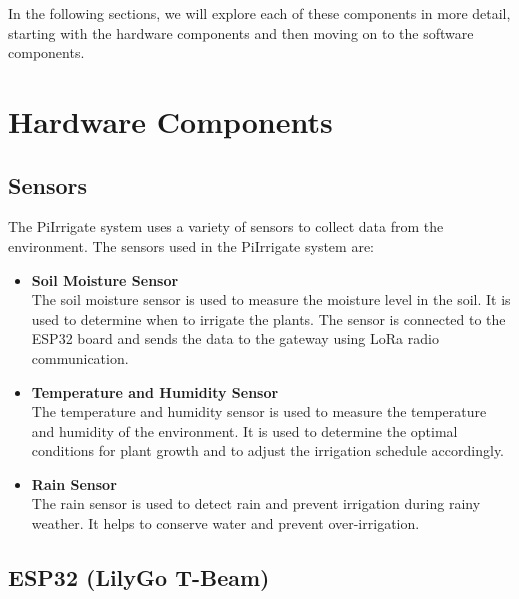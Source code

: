 In the following sections, we will explore each of these components in more detail,
starting with the hardware components and then moving on to the software components.

\section{Hardware Components}
\subsection{Sensors}
The PiIrrigate system uses a variety of sensors to collect data from the environment.
The sensors used in the PiIrrigate system are:
\begin{itemize}
  \item \textbf{Soil Moisture Sensor} \\
  The soil moisture sensor is used to measure the moisture level in the soil. It is used to determine when to irrigate the plants.
  The sensor is connected to the ESP32 board and sends the data to the gateway using LoRa radio communication.

  \item \textbf{Temperature and Humidity Sensor} \\
  The temperature and humidity sensor is used to measure the temperature and humidity of the environment.
  It is used to determine the optimal conditions for plant growth and to adjust the irrigation schedule accordingly.

  \item \textbf{Rain Sensor} \\
  The rain sensor is used to detect rain and prevent irrigation during rainy weather. 
  It helps to conserve water and prevent over-irrigation.
\end{itemize}
\subsection{ESP32 (LilyGo T-Beam)}

